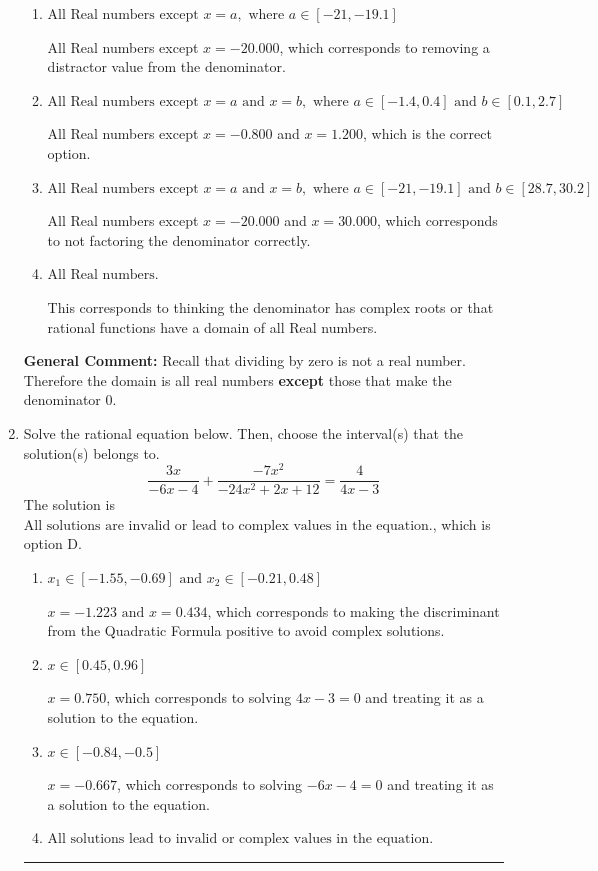 \documentclass{extbook}[14pt]
\newcommand{\litem}[1]{\item #1

\rule{\textwidth}{0.4pt}}
\begin{document}
\begin{enumerate}
{\begin{enumerate}[label=\Alph*.]
All Real numbers except $x = -0.800$, which corresponds to removing only 1 value from the denominator.
\item \( \text{All Real numbers except } x = a, \text{ where } a \in [-21, -19.1] \)

All Real numbers except $x = -20.000$, which corresponds to removing a distractor value from the denominator.
\item \( \text{All Real numbers except } x = a \text{ and } x = b, \text{ where } a \in [-1.4, 0.4] \text{ and } b \in [0.1, 2.7] \)

All Real numbers except $x = -0.800$ and $x = 1.200$, which is the correct option.
\item \( \text{All Real numbers except } x = a \text{ and } x = b, \text{ where } a \in [-21, -19.1] \text{ and } b \in [28.7, 30.2] \)

All Real numbers except $x = -20.000$ and $x = 30.000$, which corresponds to not factoring the denominator correctly.
\item \( \text{All Real numbers.} \)

This corresponds to thinking the denominator has complex roots or that rational functions have a domain of all Real numbers.
\end{enumerate}

\textbf{General Comment:} Recall that dividing by zero is not a real number. Therefore the domain is all real numbers \textbf{except} those that make the denominator 0.
}
\litem{
Solve the rational equation below. Then, choose the interval(s) that the solution(s) belongs to.
\[ \frac{3x}{-6x -4} + \frac{-7x^{2}}{-24x^{2} +2 x + 12} = \frac{4}{4x -3} \]The solution is \( \text{All solutions are invalid or lead to complex values in the equation.} \), which is option D.\begin{enumerate}[label=\Alph*.]
\item \( x_1 \in [-1.55, -0.69] \text{ and } x_2 \in [-0.21,0.48] \)

$x = -1.223 \text{ and } x = 0.434$, which corresponds to making the discriminant from the Quadratic Formula positive to avoid complex solutions.
\item \( x \in [0.45,0.96] \)

$x = 0.750$, which corresponds to solving $4x -3 = 0$ and treating it as a solution to the equation.
\item \( x \in [-0.84,-0.5] \)

$x = -0.667$, which corresponds to solving $-6x -4 = 0$ and treating it as a solution to the equation.
\item \( \text{All solutions lead to invalid or complex values in the equation.} \)


\end{enumerate}}
\end{enumerate}
\end{document}
